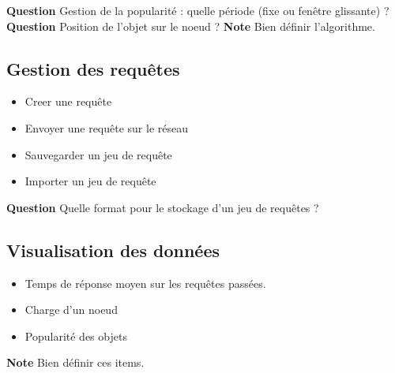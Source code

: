 \documentclass[12pt]{article}
\begin{document}
\textbf{Question } Gestion de la popularité : quelle période (fixe ou fenêtre glissante) ? \newline
\textbf{Question } Position de l'objet sur le noeud ? \newline
\textbf{Note } Bien définir l'algorithme. \newline

\subsection{Gestion des requêtes}

\begin{itemize}
 \item Creer une requête
 \item Envoyer une requête sur le réseau
 \item Sauvegarder un jeu de requête
 \item Importer un jeu de requête
\end{itemize}

\vspace{0.5cm}

\textbf{Question } Quelle format pour le stockage d'un jeu de requêtes ? \newline

\subsection{Visualisation des données}

\begin{itemize}
 \item Temps de réponse moyen sur les requêtes passées.
 \item Charge d'un noeud
 \item Popularité des objets
\end{itemize}

\vspace{0.5cm}

\textbf{Note } Bien définir ces items. \newline
\end{document}
